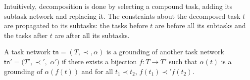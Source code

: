 \documentclass[letterpaper]{article} %
\newcommand{\Constraint}{\prec}
\newcommand{\tn}{\mathsf{tn}}
\begin{document}
Intuitively, decomposition is done by selecting a compound task, adding its subtask network and replacing it.
The constraints about the decomposed task $t$ are propagated to its subtasks: the tasks before $t$ are before all its subtasks and the tasks after $t$ are after all its subtasks.
%
%
%


A task network $\tn \!= \!(T,\Constraint,\alpha)$ is a grounding of another task network $\tn'\!= \!(T',\Constraint',$ $\alpha')$ if
there exists a bijection $f\!:\! T \!\longrightarrow\! T'$ such that
$\alpha(t)$ is a grounding of $\alpha(f(t))$ and for all $t_1 \Constraint t_2$, $f(t_1){\Constraint'} f(t_2)$.
\end{document}

